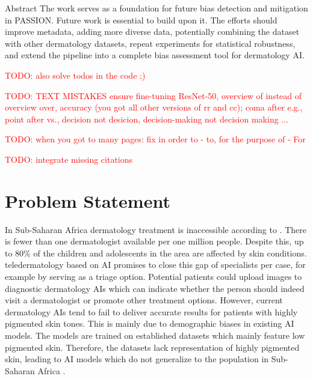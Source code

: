 \documentclass[12pt, a4paper, oneside]{book}   	%
\renewcommand{\todo}[1]{\textcolor{red}{TODO: #1}}
\begin{document}
\begin{abstractstyle}{Abstract}
	   The work serves as a foundation for future bias detection and mitigation in PASSION. Future work is essential to build upon it. The efforts should improve metadata, adding more diverse data, potentially combining the dataset with other dermatology datasets, repeat experiments for statistical robustness, and extend the pipeline into a complete bias assessment tool for dermatology AI.
	\end{abstractstyle}
	
	\tableofcontents
	
	\listoftodos
	\todo{also solve todos in the code ;)} 
	
	\todo{TEXT MISTAKES ensure fine-tuning ResNet-50, overview of instead of overview over, accuracy (you got all other versions of rr and cc); coma after e.g., point after vs., decision not desicion, decision-making not decision making ...}
	
	\todo{when you got to many pages: fix in order to - to, for the purpose of - For}
	
	\todo{integrate missing citations}
	
	\listoffigures
	\listoftables

	\printnoidxglossaries
	
	
	\mainmatter
	
	
	\chapter{Problem Statement}
		In Sub-Saharan Africa dermatology treatment is inaccessible according to \textcite{Gottfrois2024}. There is fewer than one dermatologist available per one million people. Despite this, up to 80\% of the children and adolescents in the area are affected by skin conditions. \Gls{teledermatology} based on \gls{AI} promises to close this gap of specialists per case, for example by serving as a triage option. Potential patients could upload images to diagnostic dermatology \glspl{AI} which can indicate whether the person should indeed visit a dermatologist or promote other treatment options. However, current dermatology \glspl{AI} tend to fail to deliver accurate results for patients with highly pigmented skin tones. This is mainly due to demographic biases in existing \gls{AI} models. The models are trained on established datasets which mainly feature low pigmented skin. Therefore, the datasets lack representation of highly pigmented skin, leading to AI models which do not generalize to the population in Sub-Saharan Africa \autocite{Gottfrois2024}.
		
\end{document}
